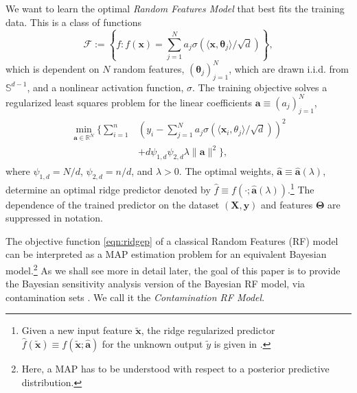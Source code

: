 \documentclass[12pt, english, oneside, a4paper]{article}
\newcommand{\R}{\mathbb{R}}
\newcommand{\y}{\boldsymbol{y}}
\newcommand{\X}{\boldsymbol{X}}
\newcommand{\x}{\boldsymbol{x}}
\renewcommand{\a}{\boldsymbol{a}}
\newcommand{\bt}{\boldsymbol{\theta}}
\newcommand{\bT}{\boldsymbol{\Theta}}
\begin{document}
We want to learn the optimal \emph{Random Features Model} that best fits the training data. This is a class of functions
\begin{equation}
    \mathcal{F} := \left\{f: f(\x) = \sum_{j=1}^{N} a_j\sigma(\langle\x,\bt_j\rangle/\sqrt{d})\right\},
    \label{eqn:rf_class}
\end{equation}
which is dependent on $N$ random features, $(\bt_j)_{j=1}^N$, which are drawn i.i.d. from $\mathbb{S}^{d-1}$,
and a nonlinear activation function, $\sigma$. The training objective solves a regularized least squares problem for the linear coefficients $\a\equiv(a_j)_{j=1}^{N}$,
\begin{align}\label{eqn:ridgep}
\begin{split}
    {\min}_{\a\in\R^N} \Bigg\{\sum_{i=1}^{n}&\left(y_i - \sum_{j=1}^{N} a_j\sigma\left(\langle \x_i,\theta_j\rangle/\sqrt{d}\right)\right)^2 \\ &+ d\psi_{1,d}\psi_{2,d}\lambda\|\a\|^2 \Bigg\},
\end{split}    
\end{align}
where $\psi_{1,d} = N/d$, $\psi_{2,d} = n/d$, and $\lambda > 0$. The optimal weights, $\widehat{\a}\equiv\widehat{\a}(\lambda)$, determine an optimal ridge predictor denoted by $\widehat{f}\equiv f(\cdot;\widehat{\a}(\lambda))$.\footnote{Given a new input feature $\tilde{\x}$, the ridge regularized predictor $\widehat{f}(\tilde{\x}) \equiv f(\tilde{\x};\widehat{\a})$ for the unknown output $\tilde{y}$ is given in \citet[Equation (5)]{baek2023asymptotics}. } The dependence of the trained predictor on the dataset $(\X,\y)$ and features $\bT$ are suppressed in notation.


The objective function \eqref{eqn:ridgep} of a classical Random Features (RF) model can be interpreted as a MAP estimation problem for an equivalent Bayesian model.\footnote{Here, a MAP has to be understood with respect to a posterior predictive distribution.} As we shall see more in detail later, the goal of this paper is to provide the Bayesian sensitivity analysis \citep{berger} version of the Bayesian RF model, via contamination sets \citep{huber}. We call it the {\em Contamination RF Model}.

\end{document}
